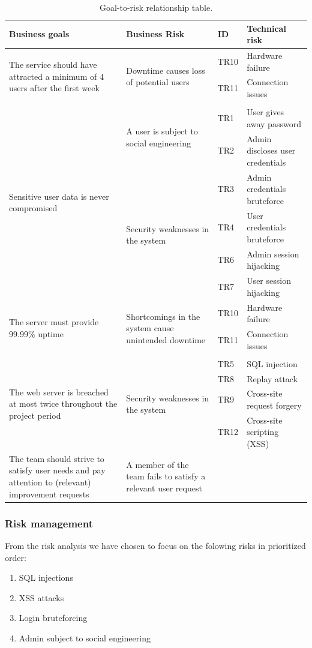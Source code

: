 \documentclass[a4paper]{article}
\begin{document}
\begin{table}[h!]
	\begin{tabular}{| p{4cm} | p{4cm}| l | l |}
    \hline
   	\textbf{Business goals} & \textbf{Business Risk} & \textbf{ID}  & \textbf{Technical risk} \\ \hline
    \multirow{3}{4cm}{The service should have attracted a minimum of 4 users after the first week} & \multirow{3}{4cm}{Downtime causes loss of potential users} & TR10 & Hardware failure \\ & & TR11 & Connection issues \\ & & & \\ \hline
    \multirow{6}{4cm}{Sensitive user data is never compromised} & \multirow{2}{4cm}{A user is subject to social engineering} & TR1 & User gives away password \\ & & TR2 & Admin discloses user credentials \\ & \multirow{4}{4cm}{Security weaknesses in the system} & TR3 & Admin credentials bruteforce \\ & & TR4 & User credentials bruteforce \\ & & TR6 & Admin session hijacking \\ & & TR7 & User session hijacking \\ \hline
    \multirow{3}{4cm}{The server must provide 99.99\% uptime} & \multirow{3}{4cm}{Shortcomings in the system cause unintended downtime} & TR10 & Hardware failure \\ & & TR11 & Connection issues \\ & & & \\ \hline
    \multirow{4}{4cm}{The web server is breached at most twice throughout the project period} & \multirow{4}{4cm}{Security weaknesses in the system} & TR5 & SQL injection \\ & & TR8 & Replay attack \\ & & TR9 & Cross-site request forgery \\ & & TR12 & Cross-site scripting (XSS) \\ \hline
    The team should strive to satisfy user needs and pay attention to (relevant) improvement requests & A member of the team fails to satisfy a relevant user request & & \\ \hline
    \end{tabular}
    \caption{Goal-to-risk relationship table.}
	\label{tab:goal_to_risk_relationship}
\end{table}

\subsubsection{Risk management}
From the risk analysis we have chosen to focus on the folowing risks in prioritized order:
\begin{enumerate}
\item{SQL injections}
\item{XSS attacks}
\item{Login bruteforcing}
\item{Admin subject to social engineering}
\end{enumerate}
\end{document}
